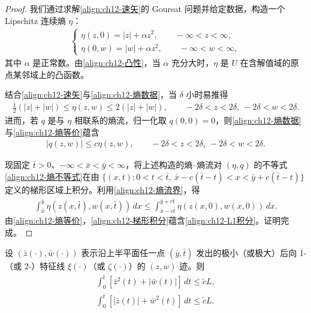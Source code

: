 \documentclass[../../main.tex]{subfiles}
\begin{document}
\begin{proof}
我们通过求解\eqref{align:ch12-速矢}的 Goursat 问题并给定数据，构造一个 Lipschitz 连续熵 $\eta$：
\begin{align}
\begin{cases}
\eta(z,0)=|z|+\alpha z^2,\qquad -\infty<z<\infty,\\
\eta(0,w)=|w|+\alpha z^2,\qquad -\infty<w<\infty,
\end{cases}
\label{align:ch12-熵数据}
\end{align}
其中 $\alpha$ 是正常数。由\eqref{align:ch12-凸性}，当 $\alpha$ 充分大时，$\eta$ 是 $U$ 在含解值域的原点某邻域上的凸函数。

结合\eqref{align:ch12-速矢}与\eqref{align:ch12-熵数据}，当 $\delta$ 小时易推得
\begin{align}
\frac12(|z|+|w|)\leqslant\eta(z,w)\leqslant 2(|z|+|w|),\qquad -2\delta<z<2\delta,\ -2\delta<w<2\delta.
\label{align:ch12-熵等价}
\end{align}
进而，若 $q$ 是与 $\eta$ 相联系的熵流，归一化取 $q(0,0)=0$，则\eqref{align:ch12-熵数据}与\eqref{align:ch12-熵等价}蕴含
\begin{align}
|q(z,w)|\leqslant c\eta(z,w),\qquad -2\delta<z<2\delta,\ -2\delta<w<2\delta.
\label{align:ch12-熵流界}
\end{align}

现固定 $\bar t>0$、$-\infty<\bar x<\bar y<\infty$，将上述构造的熵--熵流对 $(\eta,q)$ 的不等式\eqref{align:ch12-熵不等式}在由 $\{(x,t):0<t<\bar t,\ \bar x-c(\bar t-t)<x<\bar y+c(\bar t-t)\}$ 定义的梯形区域上积分。利用\eqref{align:ch12-熵流界}，得
\begin{align}
\int_{\bar x}^{\bar y}\eta(z(x,\bar t),w(x,\bar t))\,dx\leqslant\int_{\bar x-c\bar t}^{\bar y+c\bar t}\eta(z(x,0),w(x,0))\,dx.
\label{align:ch12-梯形积分}
\end{align}
由\eqref{align:ch12-熵等价}，\eqref{align:ch12-梯形积分}蕴含\eqref{align:ch12-L1积分}。证明完成。
\end{proof}

\begin{lemma}\label{lemma:ch12-特征积分}
设 $(\bar z(\cdot),\bar w(\cdot))$ 表示沿上半平面任一点 $(\bar y,\bar t)$ 发出的极小（或极大）后向 1-（或 2-）特征线 $\xi(\cdot)$（或 $\zeta(\cdot)$）的 $(z,w)$ 迹。则
\begin{align}
\int_0^{\bar t}[\bar z^2(t)+|\bar w(t)|]\,dt\leqslant\tilde c L,
\label{align:ch12-特征积分1}\\
\int_0^{\bar t}[|\bar z(t)|+\bar w^2(t)]\,dt\leqslant\tilde c L.
\label{align:ch12-特征积分2}
\end{align}
\end{lemma}
\end{document}
